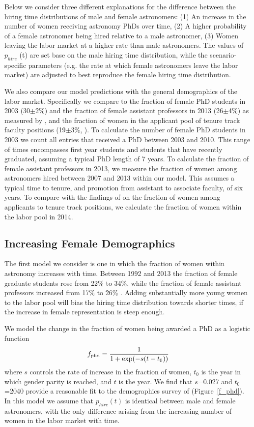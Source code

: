 \documentclass[modern]{aastex62}
\begin{document}
Below we consider three different explanations for the difference between the hiring time distributions of male and female astronomers: (1) An increase in the number of women receiving astronomy PhDs over time, (2) A higher probability of a female astronomer being hired relative to a male astronomer, (3) Women leaving the labor market at a higher rate than male astronomers. The values of $p_{hire}$ (t) are set base on the male hiring time distribution, while the scenario-specific parameters (e.g. the rate at which female astronomers leave the labor market) are adjusted to best reproduce the female hiring time distribution. 

We also compare our model predictions with the general demographics of the labor market. Specifically we compare to the fraction of female PhD students in 2003 (30$\pm$2\%) and the fraction of female assistant professors in 2013 (26$\pm$4\%) as measured by \citet{hug14}, and the fraction of women in the applicant pool of tenure track faculty positions (19$\pm$3\%, \citet{tho15}). To calculate the number of female PhD students in 2003 we count all entries that received a PhD between 2003 and 2010. This range of times encompasses first year students and students that have recently graduated, assuming a typical PhD length of 7 years. To calculate the fraction of female assistant professors in 2013, we measure the fraction of women among astronomers hired between 2007 and 2013 within our model. This assumes a typical time to tenure, and promotion from assistant to associate faculty, of six years. To compare with the findings of \citet{tho15} on the fraction of women among applicants to tenure track positions, we calculate the fraction of women within the labor pool in 2014. 

\subsection{Increasing Female Demographics}
The first model we consider is one in which the fraction of women within astronomy increases with time. Between 1992 and 2013 the fraction of female graduate students rose from 22\% to 34\%, while the fraction of female assistant professors increased from 17\% to 26\% \citep{hug14}. Adding substantially more young women to the labor pool will bias the hiring time distribution towards shorter times, if the increase in female representation is steep enough.

We model the change in the fraction of women being awarded a PhD as a logistic function
\begin{equation}
f_{\rm phd} = \frac{1}{1+\exp (-s(t-t_0))}\\
\end{equation}
where $s$ controls the rate of increase in the fraction of women, $t_0$ is the year in which gender parity is reached, and $t$ is the year. We find that $s$=0.027 and $t_0$=2040 provide a reasonable fit to the demographics survey of \citet{hug14} (Figure~\ref{f_phd}). In this model we assume that $p_{hire}(t)$ is identical between male and female astronomers, with the only difference arising from the increasing number of women in the labor market with time. 
\end{document}
